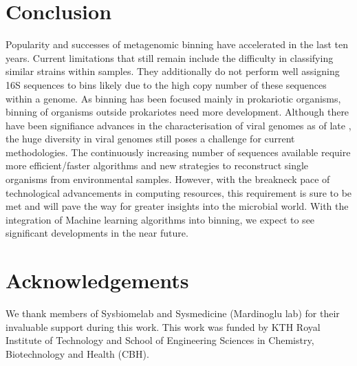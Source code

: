 \documentclass{article}
\begin{document}
\section{Conclusion}
Popularity and successes of metagenomic binning have accelerated in the last ten years.
Current limitations that still remain include the difficulty in classifying similar strains within samples.
They additionally do not perform well assigning 16S sequences to bins likely due to the high copy number of these sequences within a genome.
As binning has been focused mainly in prokariotic organisms, binning of organisms outside prokariotes need more development.
Although there have been signifiance advances in the characterisation of viral genomes as of late \cite{nayfach2021metagenomic}, the huge diversity in viral genomes still poses a challenge for current methodologies.
The continuously increasing number of sequences available require more efficient/faster algorithms and new strategies to reconstruct single organisms from environmental samples.
However, with the breakneck pace of technological advancements in computing resources, this requirement is sure to be met and will pave the way for greater insights into the microbial world.
With the integration of Machine learning algorithms into binning, we expect to see significant developments in the near future.


\section*{Acknowledgements}
We thank members of Sysbiomelab and Sysmedicine (Mardinoglu lab) for their invaluable support during this work. This work was funded by KTH Royal Institute of Technology and School of Engineering Sciences in Chemistry,
Biotechnology and Health (CBH).
\end{document}
